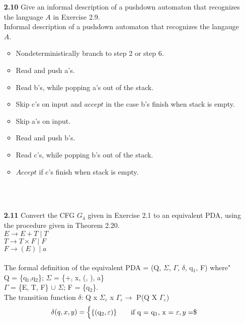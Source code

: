 \documentclass[12pt]{letter}
\begin{document}
\begin{enumerate}
\ \\ %
\item[\textbf{2.10}] Give an informal description of a pushdown automaton that recognizes the language $A$ in Exercise 2.9.
\leavevmode \\ 
Informal description of a pushdown automaton that recognizes the langauge $A$.\\
\begin{itemize}
	\item Nondeterministically branch to step 2 or step 6.
	\item Read and push a's.
	\item Read b's, while popping a's out of the stack.
	\item Skip c's on input and $accept$ in the case b's finish when stack is empty.
	\item Skip a's on input.
	\item Read and push b's.
	\item Read c's, while popping b's out of the stack.
	\item $Accept$ if c's finish when stack is empty.
\end{itemize}
\leavevmode \\ 

\ \\ %
\item[\textbf{2.11}] Convert the CFG $G_4$ given in Exercise 2.1 to an equivalent PDA, using the procedure given in Theorem 2.20.\\
\setlength\parindent{150pt} $E \rightarrow E + T \mid T $ \\ $T \rightarrow T \times F \mid F $ \\ $F \rightarrow (E)  \mid  a$ \\  \setlength\parindent{0pt}
\leavevmode \\
	 The formal definition of the equivalent PDA =	(Q, $\Sigma$, $\Gamma$, $\delta$, q$_{1}$, F) where" \\
	Q = \{q$_{1}$,q$_{2}$\}; $\Sigma$ = \{+, x, (, ), a\}\\$\Gamma$ = \{E, T, F\} $\cup$ $\Sigma$; F = \{q$_{2}$\}.\\
	The transition function $\delta$: Q x $\Sigma _{\varepsilon}$ x $\Gamma_{\varepsilon} \longrightarrow$ P(Q X $\Gamma_{\varepsilon}$)\\
	\[   
	\delta(q,x,y) = 
	\begin{cases}
	\text{\{(q$_{2}, \varepsilon$)\}} 
	&\quad\text{if q = q$_{1}$, x = $\varepsilon$}, y =  $\textdollar$ \\
	

\end{cases}\]
\end{enumerate}
\end{document}
